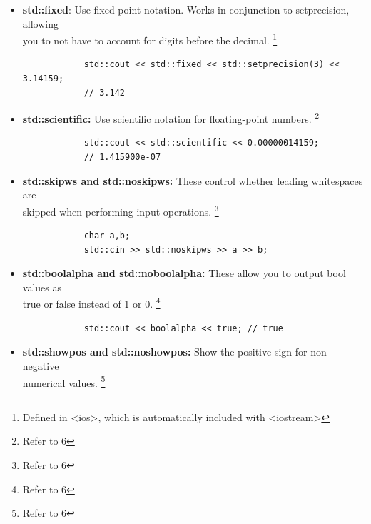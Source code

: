 \documentclass{report}
\begin{document}
\begin{itemize}
            \smallbreak
            \sepline
            \begin{verbatim}
            std::cout << std::setprecision(4) << 3.14159; // 3.142
            \end{verbatim}
            \sepline
            \pagebreak \bigbreak \noindent 
        \item \textbf{std::fixed}: Use fixed-point notation. Works in conjunction to setprecision, allowing \\ you to not have to account for digits before the decimal.  \footnote{Defined in <ios>, which is automatically included with <iostream>}
            \smallbreak
            \sepline
            \begin{verbatim}
            std::cout << std::fixed << std::setprecision(3) << 3.14159; 
            // 3.142
            \end{verbatim}
            \sepline
        \item \textbf{std::scientific:} Use scientific notation for floating-point numbers. \footnote{Refer to 6}
            \smallbreak
            \sepline
            \begin{verbatim}
            std::cout << std::scientific << 0.00000014159; 
            // 1.415900e-07 
            \end{verbatim}
            \sepline
        \item \textbf{std::skipws and std::noskipws:} These control whether leading whitespaces are \\ skipped when performing input operations. \footnote{Refer to 6}
            \smallbreak
            \sepline
            \begin{verbatim}
            char a,b;
            std::cin >> std::noskipws >> a >> b;
            \end{verbatim}
            \sepline
        \item \textbf{std::boolalpha and std::noboolalpha:} These allow you to output bool values as \\ true or false instead of 1 or 0. \footnote{Refer to 6}
            \smallbreak
            \sepline
            \begin{verbatim}
            std::cout << boolalpha << true; // true
            \end{verbatim}
            \sepline
        \item \textbf{std::showpos and std::noshowpos:} Show the positive sign for non-negative \\ numerical values. \footnote{Refer to 6}

\end{itemize}
\end{document}
